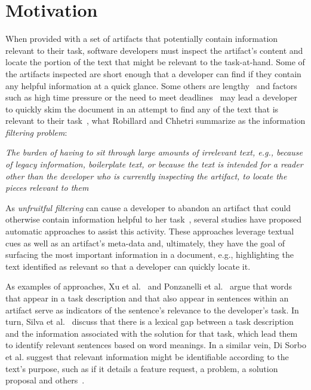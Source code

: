 \section{Motivation}
\label{cp5:motivation}


When provided with a set of artifacts that potentially contain information relevant to their task,
software developers must inspect the artifact's content and locate the portion of the text that might be relevant to the task-at-hand. 
Some of the artifacts inspected are short enough that a developer can find if they contain any helpful information at a quick glance.
Some others are lengthy~\cite{Rastkar2013t} and factors such
as high time pressure or
the need to meet deadlines~\cite{meyer2019}
may lead a developer to quickly skim the document
in an attempt to find any of the text that is relevant to their task~\cite{Starke2009},
what Robillard and Chhetri summarize as the information \textit{filtering problem}:

\smallskip
\begin{bluequote}
    \textit{The burden  of having to sit through large amounts of irrelevant text, e.g., because of legacy information, boilerplate text, or because the text is intended for a reader other than the developer who is currently inspecting the artifact, to locate the pieces relevant to them}~\cite{Robillard2015}
\end{bluequote}



As \textit{unfruitful filtering} can 
cause a developer to abandon an artifact that could otherwise contain information  helpful to her task~\cite{Brandt2009a, Starke2009},
several studies have proposed automatic approaches to assist this activity. 
These approaches leverage textual cues as well as an artifact's meta-data and, ultimately, they have the goal of surfacing 
the most important information in a document, e.g., highlighting the text identified as relevant so that a developer can quickly 
locate it.


As examples of approaches, Xu et al.~\cite{Xu2017} and Ponzanelli et al.~\cite{Ponzanelli2015}
argue that words that appear in a task description and that also appear in sentences within an artifact serve as indicators of the sentence's relevance to the developer's task.
In turn, Silva et al.~\cite{silva2019} discuss that 
there is a lexical gap between a task description and the information associated 
with the solution for that task, which lead them to identify
relevant sentences based on word meanings.
In a similar vein, Di Sorbo et al. suggest that relevant information might be identifiable 
according to the text's purpose, such as if it details a feature request, a problem, a solution proposal and others~\cite{Sorbo2015}.


